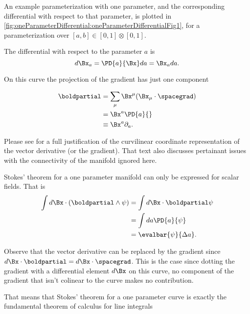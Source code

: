%
%
An example parameterization with one parameter, and the corresponding differential with respect to that parameter, is plotted in
\cref{fig:oneParameterDifferential:oneParameterDifferentialFig1}, for a parameterization over \( [a, b] \in [0,1]\otimes[0,1] \).

The differential with respect to the parameter \( a \) is
\begin{equation}\label{eqn:stokesTheoremCore:20}
d\Bx_a = \PD{a}{\Bx} da = \Bx_a da.
\end{equation}

On this curve the projection of the gradient has just one component

\begin{equation}\label{eqn:stokesTheoremCore:40}
\begin{aligned}
\boldpartial
&= \sum_\mu \Bx^\mu (\Bx_\mu \cdot \spacegrad) \\
&= \Bx^a \PD{a}{} \\
&\equiv \Bx^a \partial_a.
\end{aligned}
\end{equation}

Please see \citep{aMacdonaldVAGC} for a full justification of the curvilinear coordinate representation of the vector derivative (or the gradient).  That text also discusses pertainant issues with the connectivity of the manifold ignored here.

Stokes' theorem for a one parameter manifold can only be expressed for scalar fields.  That is
\begin{equation}\label{eqn:stokesTheoremCore:60}
\begin{aligned}
\int d\Bx \cdot (\boldpartial \wedge \psi)
&= \int d\Bx \cdot \boldpartial \psi \\
&= \int da \PD{a}{ \psi } \\
&= \evalbar{\psi}{\Delta a}.
\end{aligned}
\end{equation}

Observe that the vector derivative can be replaced by the gradient since \( d\Bx \cdot \boldpartial = d\Bx \cdot \spacegrad \).
This is the case since dotting the
gradient with a differential element \( d\Bx \) on this curve, no component of the gradient that isn't colinear to the curve makes no contribution.

That means that Stokes' theorem for a one parameter curve is exactly the fundamental theorem of calculus for line integrals

